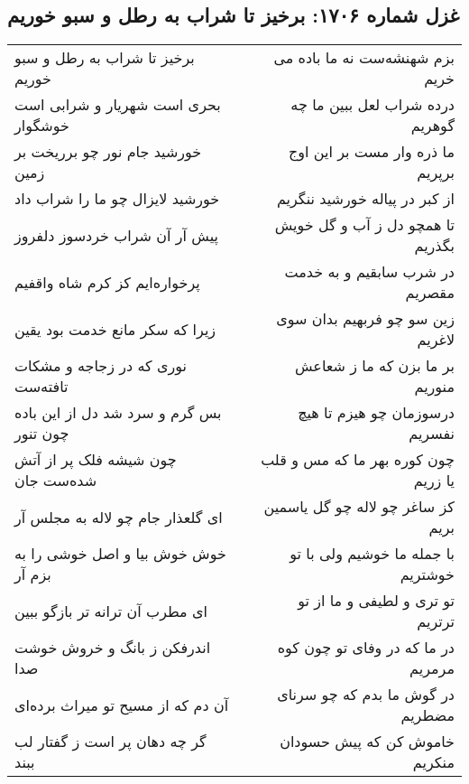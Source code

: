 \begin{center}
\section*{غزل شماره ۱۷۰۶: برخیز تا شراب به رطل و سبو خوریم}
\label{sec:1706}
\begin{longtable}{l p{0.5cm} r}
برخیز تا شراب به رطل و سبو خوریم
&&
بزم شهنشه‌ست نه ما باده می خریم
\\
بحری است شهریار و شرابی است خوشگوار
&&
درده شراب لعل ببین ما چه گوهریم
\\
خورشید جام نور چو برریخت بر زمین
&&
ما ذره وار مست بر این اوج برپریم
\\
خورشید لایزال چو ما را شراب داد
&&
از کبر در پیاله خورشید ننگریم
\\
پیش آر آن شراب خردسوز دلفروز
&&
تا همچو دل ز آب و گل خویش بگذریم
\\
پرخواره‌ایم کز کرم شاه واقفیم
&&
در شرب سابقیم و به خدمت مقصریم
\\
زیرا که سکر مانع خدمت بود یقین
&&
زین سو چو فربهیم بدان سوی لاغریم
\\
نوری که در زجاجه و مشکات تافته‌ست
&&
بر ما بزن که ما ز شعاعش منوریم
\\
بس گرم و سرد شد دل از این باده چون تنور
&&
درسوزمان چو هیزم تا هیچ نفسریم
\\
چون شیشه فلک پر از آتش شده‌ست جان
&&
چون کوره بهر ما که مس و قلب یا زریم
\\
ای گلعذار جام چو لاله به مجلس آر
&&
کز ساغر چو لاله چو گل یاسمین بریم
\\
خوش خوش بیا و اصل خوشی را به بزم آر
&&
با جمله ما خوشیم ولی با تو خوشتریم
\\
ای مطرب آن ترانه تر بازگو ببین
&&
تو تری و لطیفی و ما از تو ترتریم
\\
اندرفکن ز بانگ و خروش خوشت صدا
&&
در ما که در وفای تو چون کوه مرمریم
\\
آن دم که از مسیح تو میراث برده‌ای
&&
در گوش ما بدم که چو سرنای مضطریم
\\
گر چه دهان پر است ز گفتار لب ببند
&&
خاموش کن که پیش حسودان منکریم
\\
\end{longtable}
\end{center}
